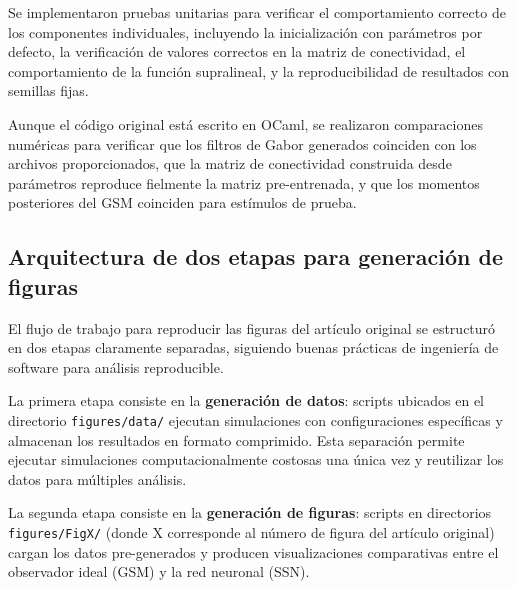 Se implementaron pruebas unitarias para verificar el comportamiento correcto de los componentes individuales, incluyendo la inicialización con parámetros por defecto, la verificación de valores correctos en la matriz de conectividad, el comportamiento de la función supralineal, y la reproducibilidad de resultados con semillas fijas.

Aunque el código original está escrito en OCaml, se realizaron comparaciones numéricas para verificar que los filtros de Gabor generados coinciden con los archivos proporcionados, que la matriz de conectividad construida desde parámetros reproduce fielmente la matriz pre-entrenada, y que los momentos posteriores del GSM coinciden para estímulos de prueba.

\subsection{Arquitectura de dos etapas para generación de figuras}
\label{subsec:impl_dos_etapas}

El flujo de trabajo para reproducir las figuras del artículo original se estructuró en dos etapas claramente separadas, siguiendo buenas prácticas de ingeniería de software para análisis reproducible.

La primera etapa consiste en la \textbf{generación de datos}: scripts ubicados en el directorio \texttt{figures/data/} ejecutan simulaciones con configuraciones específicas y almacenan los resultados en formato comprimido. Esta separación permite ejecutar simulaciones computacionalmente costosas una única vez y reutilizar los datos para múltiples análisis.

La segunda etapa consiste en la \textbf{generación de figuras}: scripts en directorios \texttt{figures/FigX/} (donde X corresponde al número de figura del artículo original) cargan los datos pre-generados y producen visualizaciones comparativas entre el observador ideal (\acrshort{GSM}) y la red neuronal (\acrshort{SSN}).




